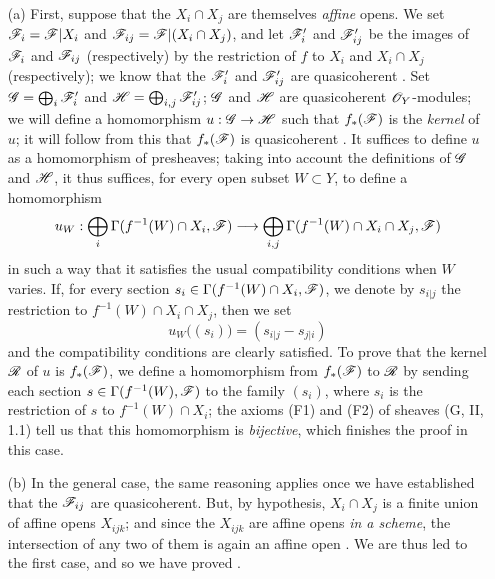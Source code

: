 \documentclass[10pt,oneside]{book}
\begin{document}
\begin{itemize}
  \item[(a)] First, suppose that the $X_i\cap X_j$
             are themselves \emph{affine} opens. We set $\mathscr{F}_i=\mathscr{F}|X_i$ and
             $\mathscr{F}_{ij}=\mathscr{F}|(X_i\cap X_j)$, and let $\mathscr{F}'_i$ and
             $\mathscr{F}'_{ij}$ be the images of $\mathscr{F}_i$ and $\mathscr{F}_{ij}$
             (respectively) by the restriction of $f$ to $X_i$ and $X_i\cap X_j$
             (respectively); we know that the $\mathscr{F}'_i$ and $\mathscr{F}'_{ij}$ are
             quasicoherent . Set $\mathscr{G}=\bigoplus_i\mathscr{F}'_i$ and
             $\mathscr{H}=\bigoplus_{i,j}\mathscr{F}'_{ij}$; $\mathscr{G}$ and $\mathscr{H}$ are
             quasicoherent $\mathscr{O}_Y$-modules; we will define a homomorphism
             $u:\mathscr{G}\to\mathscr{H}$ such that $f_*(\mathscr{F})$ is the
             \emph{kernel} of $u$; it will follow from this that $f_*(\mathscr{F})$ is
             quasicoherent . It suffices to define $u$ as
             a homomorphism of presheaves; taking into account the definitions of $\mathscr{G}$
             and $\mathscr{H}$, it thus suffices, for every open subset $W\subset Y$, to define a
             homomorphism
             \[
               u_W:\bigoplus_i\Gamma(f^{-1}(W)\cap X_i,\mathscr{F})
               \longrightarrow\bigoplus_{i,j}\Gamma(f^{-1}(W)\cap X_i\cap X_j,\mathscr{F})
             \]
             in such a way that it satisfies the usual compatibility conditions when $W$
             varies. If, for every section $s_i\in\Gamma(f^{-1}(W)\cap X_i,\mathscr{F})$, we
             denote by $s_{i|j}$ the restriction to $f^{-1}(W)\cap X_i\cap X_j$, then we set
             \[
               u_W\big((s_i)\big)=(s_{i|j}-s_{j|i})
             \]
             and the compatibility conditions are clearly satisfied. To prove that the kernel
             $\mathscr{R}$ of $u$ is $f_*(\mathscr{F})$, we define a homomorphism from $f_*(\mathscr{F})$ to
             $\mathscr{R}$ by sending each section $s\in\Gamma(f^{-1}(W),\mathscr{F})$ to the family
             $(s_i)$, where $s_i$ is the restriction of $s$ to $f^{-1}(W)\cap X_i$; the
             axioms (F1) and (F2) of sheaves (G, II, 1.1) tell us that this homomorphism is
             \emph{bijective}, which finishes the proof in this case.
  \item[(b)] In the general case, the same reasoning applies once we have established that
             the $\mathscr{F}_{ij}$ are quasicoherent. But, by hypothesis, $X_i\cap X_j$ is a
             finite union of affine opens $X_{ijk}$; and since the $X_{ijk}$ are affine opens
             \emph{in a scheme}, the intersection of any two of them is again an affine open
             . We are thus led to the first case, and so we have proved
             .
\end{itemize}
\end{document}
